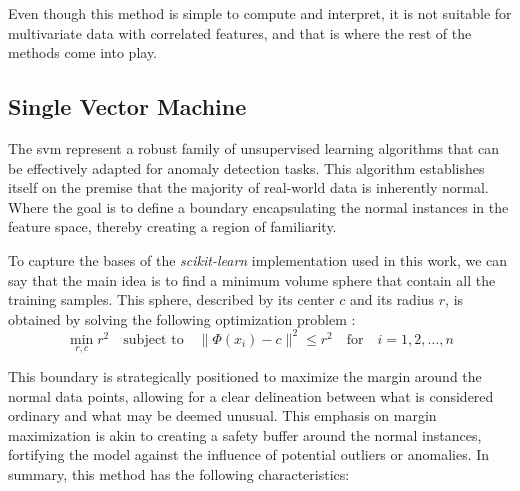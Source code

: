 \documentclass[11pt,english,a4paper,hidelinks]{book}
\begin{document}
\noindent Even though this method is simple to compute and interpret, it is not suitable for multivariate data with correlated features, and that is where the rest of the methods come into play.

\subsection{Single Vector Machine}

\noindent The \gls{svm} represent a robust family of unsupervised learning algorithms that can be effectively adapted for anomaly detection tasks. This algorithm establishes itself on the premise that the majority of real-world data is inherently normal. Where the goal is to define a boundary encapsulating the normal instances in the feature space, thereby creating a region of familiarity. 

\vspace{0.5cm}
\noindent To capture the bases of the \textit{scikit-learn} implementation \cite{scikit2025oneclasssvm} used in this work, we can say that the main idea is to find a minimum volume sphere that contain all the training samples. This sphere, described by its center \(c\) and its radius \(r\), is obtained by solving the following optimization problem \cite{zineb2012simple}:
\begin{equation}
\min_{r,c} r^2 \quad \text{subject to} \quad \|\Phi(x_i) - c\|^2 \leq r^2 \quad \text{for} \quad i = 1, 2, \ldots, n
\end{equation}

\vspace{0.5cm}
\noindent This boundary is strategically positioned to maximize the margin around the normal data points, allowing for a clear delineation between what is considered ordinary and what may be deemed unusual. This emphasis on margin maximization is akin to creating a safety buffer around the normal instances, fortifying the model against the influence of potential outliers or anomalies. In summary, this method has the following characteristics:
\end{document}

